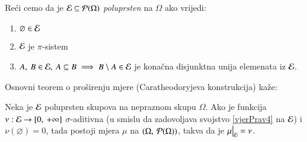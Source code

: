 Re\' ci cemo da je $\mathcal{E} \subseteq \mathcal{P}({\Omega})$ \emph{poluprsten}
na $\Omega$ ako vrijedi:
\begin{enumerate}[label=(\roman*)]
    \item $\varnothing \in \mathcal{E}$
    \item $\mathcal{E}$ je $\pi$-sistem
    \item $A, \: B \in \mathcal{E}, \: A \subseteq B \implies B \setminus
        A \in \mathcal{E}$ je kona\v cna disjunktna unija elemenata iz $\mathcal{E}$.
\end{enumerate}

Osnovni teorem o pro\v sirenju mjere (Caratheodoryjeva konstrukcija)
ka\v ze:

\begin{tm}  \label{tm:2.11}
    Neka je $\mathcal{E}$ poluprsten skupova na nepraznom skupu $\Omega$. Ako
    je funkcija $\nu: \mathcal{E} \to [0, \: + \infty]$ $\sigma$-aditivna
    (u smislu da zadovoljava svojstvo \eqref{vjerPrav4} na $\mathcal{E}$)
    i $\nu(\varnothing) = 0$, tada postoji mjera $\mu$ na $(\Omega,
    \: \mathcal{P}({\Omega}))$, takva da je $\restr{\mu}{\E} = \nu$.
\end{tm}


